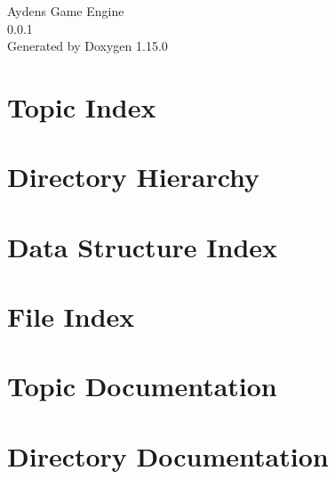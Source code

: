 \documentclass[twoside]{book}
\newcommand{\+}{\discretionary{\mbox{\scriptsize$\hookleftarrow$}}{}{}}
\newcommand{\clearemptydoublepage}{%
    \newpage{\pagestyle{empty}\cleardoublepage}%
  }
\begin{document}
  \raggedbottom
    \hypersetup{pageanchor=false,
                bookmarksnumbered=true,
                pdfencoding=unicode
               }
  \begin{titlepage}
  \vspace*{7cm}
  \begin{center}%
  {\Large Ayden\textquotesingle{}s Game Engine}\\
  [1ex]\large 0.\+0.\+1 \\
  \vspace*{1cm}
  {\large Generated by Doxygen 1.15.0}\\
  \end{center}
  \end{titlepage}
  \clearemptydoublepage
  \tableofcontents
  \clearemptydoublepage
  \hypersetup{pageanchor=true}


\chapter{Topic Index}

\chapter{Directory Hierarchy}

\chapter{Data Structure Index}

\chapter{File Index}

\chapter{Topic Documentation}





\chapter{Directory Documentation}















\end{document}

